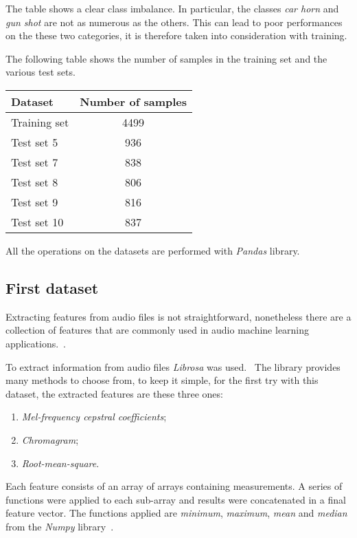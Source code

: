 The table shows a clear class imbalance. In particular, the classes 
\emph{car horn} and \emph{gun shot} are not as numerous as the others. 
This can lead to poor performances on the these two categories, it is
therefore taken 
into consideration with training. 

The following table shows the number of samples in the training set and 
the various test sets.

\begin{center}
    \begin{tabular}{ |l|c| } 
        \hline
        Dataset & Number of samples \\
        \hline
        Training set & 4499 \\
        Test set 5 & 936 \\
        Test set 7 & 838 \\
        Test set 8 & 806 \\
        Test set 9 & 816 \\
        Test set 10 & 837 \\
        \hline
    \end{tabular}
\end{center}

All the operations on the datasets are performed with \emph{Pandas} library.~\cite{pandas}

\subsection{First dataset}
Extracting features from audio files is not straightforward, nonetheless there 
are a collection of features that are commonly used in audio machine learning 
applications.~\cite{features}.

To extract information from audio files \emph{Librosa} was used.~\cite{librosa}
The library provides many methods to choose from,
to keep it simple, for the first try with this dataset, the extracted features 
are these three ones: 
\begin{enumerate}
    \item \emph{Mel-frequency cepstral coefficients};
    \item \emph{Chromagram};
    \item \emph{Root-mean-square}.
\end{enumerate}
Each feature consists of an array of arrays containing measurements. 
A series of functions were applied to each sub-array and results 
were concatenated in a final feature vector. 
The functions applied are \emph{minimum}, \emph{maximum}, \emph{mean} 
and \emph{median} from the \emph{Numpy} library~\cite{numpy}.

